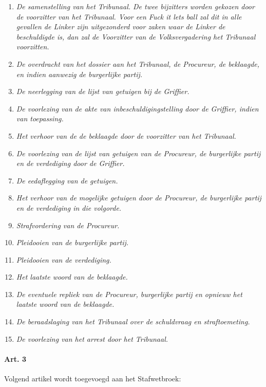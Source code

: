 \begin{enumerate}
\def\labelenumi{\arabic{enumi}.}
\tightlist
\item
  \emph{De samenstelling van het Tribunaal. De twee bijzitters worden
  gekozen door de voorzitter van het Tribunaal. Voor een Fuck it lets
  ball zal dit in alle gevallen de Linker zijn uitgezonderd voor zaken
  waar de Linker de beschuldigde is, dan zal de Voorzitter van de
  Volksvergadering het Tribunaal voorzitten.}
\item
  \emph{De overdracht van het dossier aan het Tribunaal, de Procureur,
  de beklaagde, en indien aanwezig de burgerlijke partij.}
\item
  \emph{De neerlegging van de lijst van getuigen bij de Griffier.}
\item
  \emph{De voorlezing van de akte van inbeschuldigingstelling door de
  Griffier, indien van toepassing.}
\item
  \emph{Het verhoor van de de beklaagde door de voorzitter van het
  Tribunaal.}
\item
  \emph{De voorlezing van de lijst van getuigen van de Procureur, de
  burgerlijke partij en de verdediging door de Griffier.}
\item
  \emph{De eedaflegging van de getuigen.}
\item
  \emph{Het verhoor van de mogelijke getuigen door de Procureur, de
  burgerlijke partij en de verdediging in die volgorde.}
\item
  \emph{Strafvordering van de Procureur.}
\item
  \emph{Pleidooien van de burgerlijke partij.}
\item
  \emph{Pleidooien van de verdediging.}
\item
  \emph{Het laatste woord van de beklaagde.}
\item
  \emph{De eventuele repliek van de Procureur, burgerlijke partij en
  opnieuw het laatste woord van de beklaagde.}
\item
  \emph{De beraadslaging van het Tribunaal over de schuldvraag en
  straftoemeting.}
\item
  \emph{De voorlezing van het arrest door het Tribunaal.}
\end{enumerate}

\hypertarget{art.-3}{%
\paragraph{Art. 3}\label{art.-3}}

Volgend artikel wordt toegevoegd aan het Stafwetbroek:

